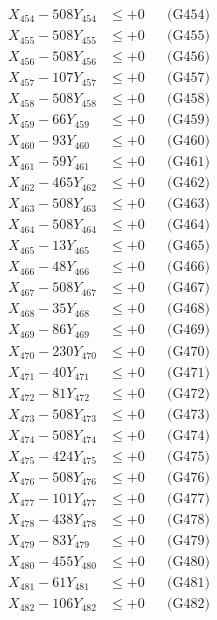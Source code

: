 \documentclass[a4paper,10pt]{article}
\begin{document}
{\begin{align}
X_{454} - 508Y_{454} &\leq +0 && \text{(G454)} \\
X_{455} - 508Y_{455} &\leq +0 && \text{(G455)} \\
X_{456} - 508Y_{456} &\leq +0 && \text{(G456)} \\
X_{457} - 107Y_{457} &\leq +0 && \text{(G457)} \\
X_{458} - 508Y_{458} &\leq +0 && \text{(G458)} \\
X_{459} - 66Y_{459} &\leq +0 && \text{(G459)} \\
X_{460} - 93Y_{460} &\leq +0 && \text{(G460)} \\
\allowbreak
X_{461} - 59Y_{461} &\leq +0 && \text{(G461)} \\
X_{462} - 465Y_{462} &\leq +0 && \text{(G462)} \\
X_{463} - 508Y_{463} &\leq +0 && \text{(G463)} \\
X_{464} - 508Y_{464} &\leq +0 && \text{(G464)} \\
X_{465} - 13Y_{465} &\leq +0 && \text{(G465)} \\
X_{466} - 48Y_{466} &\leq +0 && \text{(G466)} \\
X_{467} - 508Y_{467} &\leq +0 && \text{(G467)} \\
X_{468} - 35Y_{468} &\leq +0 && \text{(G468)} \\
X_{469} - 86Y_{469} &\leq +0 && \text{(G469)} \\
X_{470} - 230Y_{470} &\leq +0 && \text{(G470)} \\
\allowbreak
X_{471} - 40Y_{471} &\leq +0 && \text{(G471)} \\
X_{472} - 81Y_{472} &\leq +0 && \text{(G472)} \\
X_{473} - 508Y_{473} &\leq +0 && \text{(G473)} \\
X_{474} - 508Y_{474} &\leq +0 && \text{(G474)} \\
X_{475} - 424Y_{475} &\leq +0 && \text{(G475)} \\
X_{476} - 508Y_{476} &\leq +0 && \text{(G476)} \\
X_{477} - 101Y_{477} &\leq +0 && \text{(G477)} \\
X_{478} - 438Y_{478} &\leq +0 && \text{(G478)} \\
X_{479} - 83Y_{479} &\leq +0 && \text{(G479)} \\
X_{480} - 455Y_{480} &\leq +0 && \text{(G480)} \\
\allowbreak
X_{481} - 61Y_{481} &\leq +0 && \text{(G481)} \\
X_{482} - 106Y_{482} &\leq +0 && \text{(G482)} \\

\end{align}}
\end{document}
